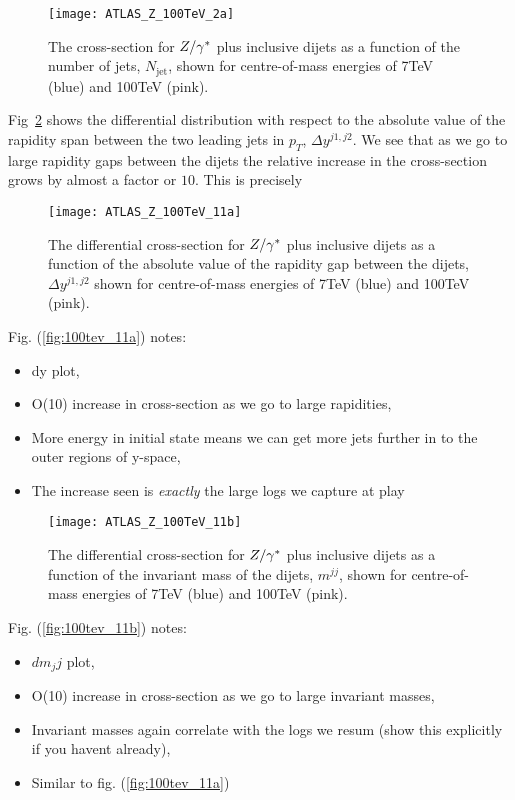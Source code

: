 	\begin{figure}[bth]
		\centering
		\texttt{[image: ATLAS\_Z\_100TeV\_2a]}
		\caption{The cross-section for $Z/\gamma^*$ plus inclusive dijets as a function of the number of
		jets, $N_{\text{jet}}$, shown for centre-of-mass energies of 7TeV (blue) and 100TeV (pink).}
		\label{fig:100tev_2a}
	\end{figure}

	Fig~\ref{fig:100tev_11a} shows the differential distribution with respect to the absolute value of the
	rapidity span between the two leading jets in $p_T$, $\Delta y^{j1, j2}$.  We see that as we go to
	large rapidity gaps between the dijets the relative increase in the cross-section grows by almost a
	factor or $10$.  This is precisely

	\begin{figure}[bth]
		\centering
		\texttt{[image: ATLAS\_Z\_100TeV\_11a]}
		\caption{The differential cross-section for $Z/\gamma^*$ plus inclusive dijets as a function of the absolute value of the
		         rapidity gap between the dijets, $\Delta y^{j1, j2}$ shown for centre-of-mass energies of 7TeV (blue) and
		         100TeV (pink).}
		\label{fig:100tev_11a}
	\end{figure}

	Fig. (\eqref{fig:100tev_11a}) notes:

	\begin{itemize}
		\item dy plot,
		\item O(10) increase in cross-section as we go to large rapidities,
		\item More energy in initial state means we can get more jets further in to the outer regions of y-space,
		\item The increase seen is \emph{exactly} the large logs we capture at play
	\end{itemize}

	\begin{figure}[bth]
		\centering
		\texttt{[image: ATLAS\_Z\_100TeV\_11b]}
		\caption{The differential cross-section for $Z/\gamma^*$ plus inclusive dijets as a function of the invariant mass
		         of the dijets, $m^{jj}$, shown for centre-of-mass energies of 7TeV (blue) and 100TeV (pink).}
		\label{fig:100tev_11b}
	\end{figure}

	Fig. (\eqref{fig:100tev_11b}) notes:

	\begin{itemize}
		\item $dm_jj$ plot,
		\item O(10) increase in cross-section as we go to large invariant masses,
		\item Invariant masses again correlate with the logs we resum (show this explicitly if you havent already),
		\item Similar to fig. (\eqref{fig:100tev_11a})
	\end{itemize}

